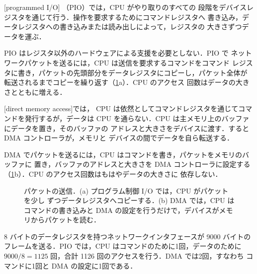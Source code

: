 \documentclass[../main.tex]{subfiles}
\begin{document}
\begin{definition}[プログラム制御 I/O]
  [programmed I/O]%
  （PIO）では，CPU がやり取りのすべての
  段階をデバイスレジスタを通じて行う．操作を要求するためにコマンドレジスタへ
  書き込み，データレジスタへの書き込みまたは読み出しによって，レジスタの
  大きさずつデータを運ぶ．
\end{definition}

PIO はレジスタ以外のハードウェアによる支援を必要としない．PIO で
ネットワークパケットを送るには，CPU は送信を要求するコマンドをコマンド
レジスタに書き，パケットの先頭部分をデータレジスタにコピーし，パケット全体が
転送されるまでコピーを繰り返す（\cref{fig:l11-pio-dma}a）．CPU のアクセス
回数はデータの大きさとともに増える．

\begin{definition}[ダイレクトメモリアクセス]
  [direct memory access]では，
  CPU は依然としてコマンドレジスタを通じてコマンドを発行するが，データは CPU
  を通らない．CPU は主メモリ上のバッファにデータを置き，そのバッファの
  アドレスと大きさをデバイスに渡す．すると DMA コントローラが，メモリと
  デバイスの間でデータを自ら転送する．
\end{definition}

DMA でパケットを送るには，CPU はコマンドを書き，パケットをメモリのバッファに
置き，バッファのアドレスと大きさを DMA コントローラに設定する
（\cref{fig:l11-pio-dma}b）．CPU のアクセス回数はもはやデータの大きさに
依存しない．

\begin{figure}[htbp]
  \centering
  
  \caption{パケットの送信．(a) プログラム制御 I/O では，CPU がパケットを少し
    ずつデータレジスタへコピーする．(b) DMA では，CPU はコマンドの書き込みと
    DMA の設定を行うだけで，デバイスがメモリからパケットを読む．}
  \label{fig:l11-pio-dma}
\end{figure}

\begin{example}
  8 バイトのデータレジスタを持つネットワークインタフェースが 9000 バイトの
  フレームを送る．PIO では，CPU はコマンドのために1回，データのために
  $9000/8 = 1125$ 回，合計 1126 回のアクセスを行う．DMA では2回，すなわち
  コマンドに1回と DMA の設定に1回である．
\end{example}
\end{document}
